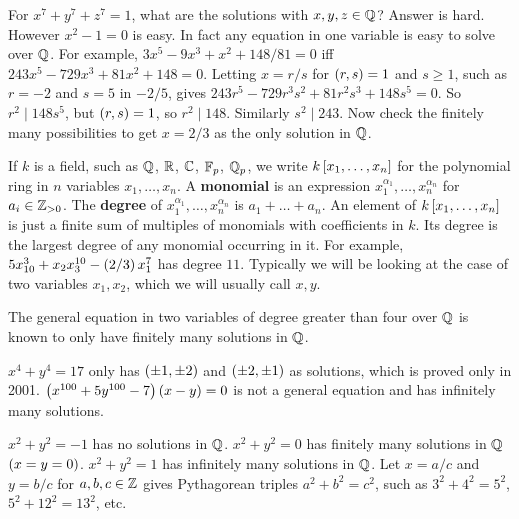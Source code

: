 \begin{example*}
For $ x^7 + y^7 + z^7 = 1 $, what are the solutions with $ x, y, z \in \Q $? Answer is hard. However $ x^2 - 1 = 0 $ is easy. In fact any equation in one variable is easy to solve over $ \Q $. For example, $ 3x^5 - 9x^3 + x^2 + 148 / 81 = 0 $ iff $ 243x^5 - 729x^3 + 81x^2 + 148 = 0 $. Letting $ x = r / s $ for $ \rb{r, s} = 1 $ and $ s \ge 1 $, such as $ r = -2 $ and $ s = 5 $ in $ -2 / 5 $, gives $ 243r^5 - 729r^3s^2 + 81r^2s^3 + 148s^5 = 0 $. So $ r^2 \mid 148s^5 $, but $ \rb{r, s} = 1 $, so $ r^2 \mid 148 $. Similarly $ s^2 \mid 243 $. Now check the finitely many possibilities to get $ x = 2 / 3 $ as the only solution in $ \Q $.
\end{example*}

If $ k $ is a field, such as $ \Q $, $ \R $, $ \C $, $ \F_p $, $ \Q_p $, we write $ k\sb{x_1, \dots, x_n} $ for the polynomial ring in $ n $ variables $ x_1, \dots, x_n $. A \textbf{monomial} is an expression $ x_1^{\alpha_1}, \dots, x_n^{\alpha_n} $ for $ a_i \in \Z_{> 0} $. The \textbf{degree} of $ x_1^{\alpha_1}, \dots, x_n^{\alpha_n} $ is $ a_1 + \dots + a_n $. An element of $ k\sb{x_1, \dots, x_n} $ is just a finite sum of multiples of monomials with coefficients in $ k $. Its degree is the largest degree of any monomial occurring in it. For example, $ 5x_{10}^3 + x_2x_3^{10} - \rb{2 / 3}x_1^7 $ has degree $ 11 $. Typically we will be looking at the case of two variables $ x_1, x_2 $, which we will usually call $ x, y $.

\begin{theorem}
The general equation in two variables of degree greater than four over $ \Q $ is known to only have finitely many solutions in $ \Q $.
\end{theorem}

\begin{example*}
$ x^4 + y^4 = 17 $ only has $ \rb{\pm 1, \pm 2} $ and $ \rb{\pm 2, \pm 1} $ as solutions, which is proved only in 2001. $ \rb{x^{100} + 5y^{100} - 7}\rb{x - y} = 0 $ is not a general equation and has infinitely many solutions.
\end{example*}

\begin{example*}
$ x^2 + y^2 = -1 $ has no solutions in $ \Q $. $ x^2 + y^2 = 0 $ has finitely many solutions in $ \Q $ $ \rb{x = y = 0} $. $ x^2 + y^2 = 1 $ has infinitely many solutions in $ \Q $. Let $ x = a / c $ and $ y = b / c $ for $ a, b, c \in \Z $ gives Pythagorean triples $ a^2 + b^2 = c^2 $, such as $ 3^2 + 4^2 = 5^2 $, $ 5^2 + 12^2 = 13^2 $, etc.
\end{example*}

